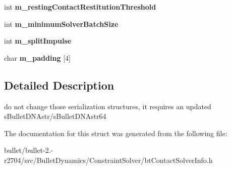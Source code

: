 \begin{DoxyCompactItemize}
\item 
\hypertarget{structbt_contact_solver_info_float_data_a8f44b084eeca8a6af2663d3a1bba8dfa}{int {\bfseries m\+\_\+resting\+Contact\+Restitution\+Threshold}}\label{structbt_contact_solver_info_float_data_a8f44b084eeca8a6af2663d3a1bba8dfa}

\item 
\hypertarget{structbt_contact_solver_info_float_data_aaba8ce2bc8efead590e9c1c694ba9f6d}{int {\bfseries m\+\_\+minimum\+Solver\+Batch\+Size}}\label{structbt_contact_solver_info_float_data_aaba8ce2bc8efead590e9c1c694ba9f6d}

\item 
\hypertarget{structbt_contact_solver_info_float_data_a5c849cdcbbe0021d37bfaf7ba57f1f7b}{int {\bfseries m\+\_\+split\+Impulse}}\label{structbt_contact_solver_info_float_data_a5c849cdcbbe0021d37bfaf7ba57f1f7b}

\item 
\hypertarget{structbt_contact_solver_info_float_data_aa1f1dc08f975d3a4c5219b9e99934bf6}{char {\bfseries m\+\_\+padding} \mbox{[}4\mbox{]}}\label{structbt_contact_solver_info_float_data_aa1f1dc08f975d3a4c5219b9e99934bf6}

\end{DoxyCompactItemize}


\subsection{Detailed Description}
do not change those serialization structures, it requires an updated s\+Bullet\+D\+N\+Astr/s\+Bullet\+D\+N\+Astr64 

The documentation for this struct was generated from the following file\+:\begin{DoxyCompactItemize}
\item 
bullet/bullet-\/2.-\/r2704/src/\+Bullet\+Dynamics/\+Constraint\+Solver/bt\+Contact\+Solver\+Info.\+h\end{DoxyCompactItemize}
